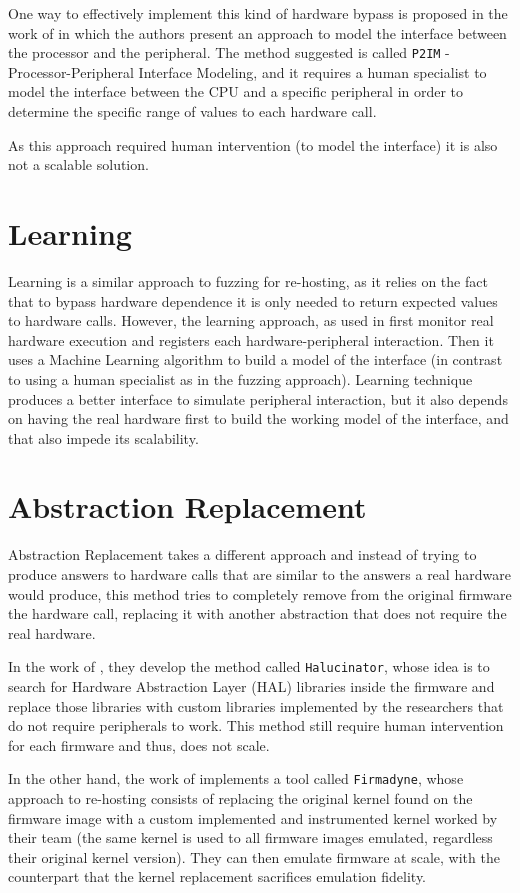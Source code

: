 One way to effectively implement this kind of hardware bypass is proposed in the work of \cite{p2im} in which the authors present an approach to model the interface between the processor and the peripheral. The method suggested is called {\tt P2IM} - Processor-Peripheral Interface Modeling, and it requires a human specialist to model the interface between the CPU and a specific peripheral in order to determine the specific range of values to each hardware call.

As this approach required human intervention (to model the interface) it is also not a scalable solution.

\section{Learning}

Learning is a similar approach to fuzzing for re-hosting, as it relies on the fact that to bypass hardware dependence it is only needed to return expected values to hardware calls. However, the learning approach, as used in \cite{pretender} first monitor real hardware execution and registers each hardware-peripheral interaction. Then it uses a Machine Learning algorithm to build a model of the interface (in contrast to using a human specialist as in the fuzzing approach). Learning technique produces a better interface to simulate peripheral interaction, but it also depends on having the real hardware first to build the working model of the interface, and that also impede its scalability.

\section{Abstraction Replacement}

Abstraction Replacement takes a different approach and instead of trying to produce answers to hardware calls that are similar to the answers a real hardware would produce, this method tries to completely remove from the original firmware the hardware call, replacing it with another abstraction that does not require the real hardware.

In the work of \cite{halucinator}, they develop the method called {\tt Halucinator}, whose idea is to search for Hardware Abstraction Layer (HAL) libraries inside the firmware and replace those libraries with custom libraries implemented by the researchers that do not require peripherals to work. This method still require human intervention for each firmware and thus, does not scale.

In the other hand, the work of \cite{firmadyne} implements a tool called {\tt Firmadyne}, whose approach to re-hosting consists of replacing the original kernel found on the firmware image with a custom implemented and instrumented kernel worked by their team (the same kernel is used to all firmware images emulated, regardless their original kernel version). They can then emulate firmware at scale, with the counterpart that the kernel replacement sacrifices emulation fidelity.

